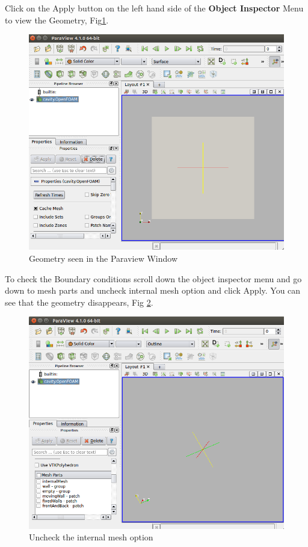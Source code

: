 \documentclass[a4paper,12pt]{report}
\begin{document}
\vspace{0.8cm}
\flushleft Click on the Apply button on the left hand side of the \textbf{Object Inspector} Menu to view the Geometry, Fig\ref{geom}.

\begin{figure}[ht]  
\begin{center}  
\includegraphics[scale=0.32]{geom.png}
\caption{Geometry seen in the Paraview Window}
\label{geom}
\end{center}  
\end{figure}

\flushleft To check the Boundary conditions scroll down the object inspector menu and go down to mesh parts and uncheck internal mesh option and click Apply. You can see that the geometry disappears, Fig \ref{parts}.

\begin{figure}[ht]  
\begin{center}  
\includegraphics[scale=0.32]{part1.png}
\caption{Uncheck the internal mesh option}
\label{parts}
\end{center}  
\end{figure}
\end{document}
